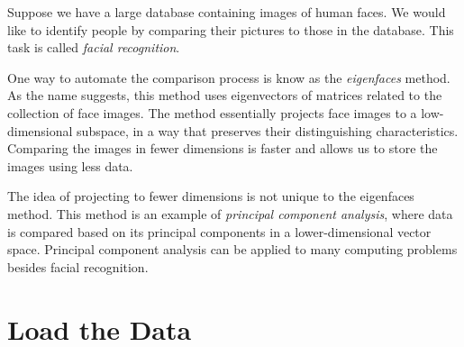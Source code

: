 \label{lab:FacialRecognition}


Suppose we have a large database containing images of human faces.
We would like to identify people by comparing their pictures to those in the database.
This task is called \emph{facial recognition}.

One way to automate the comparison process is know as the \emph{eigenfaces} method.
As the name suggests, this method uses eigenvectors of matrices related to the collection of face images.
The method essentially projects face images to a low-dimensional subspace, in a way that preserves their distinguishing characteristics.
Comparing the images in fewer dimensions is faster and allows us to store the images using less data.

The idea of projecting to fewer dimensions is not unique to the eigenfaces method.
This method is an example of \emph{principal component analysis}, where data is compared based on its principal components in a lower-dimensional vector space.
Principal component analysis can be applied to many computing problems besides facial recognition.

\section*{Load the Data} %

